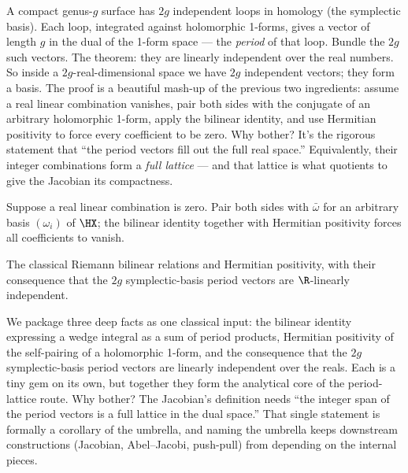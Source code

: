 \begin{layman}
A compact genus-\(g\) surface has \(2g\) independent loops in homology
(the symplectic basis). Each loop, integrated against holomorphic
1-forms, gives a vector of length \(g\) in the dual of the 1-form
space — the \emph{period} of that loop. Bundle the \(2g\) such
vectors. The theorem: they are linearly independent over the real
numbers. So inside a \(2g\)-real-dimensional space we have \(2g\)
independent vectors; they form a basis. The proof is a beautiful
mash-up of the previous two ingredients: assume a real linear
combination vanishes, pair both sides with the conjugate of an arbitrary
holomorphic 1-form, apply the bilinear identity, and use Hermitian
positivity to force every coefficient to be zero. Why bother? It's the
rigorous statement that ``the period vectors fill out the full real
space.'' Equivalently, their integer combinations form a \emph{full
lattice} — and that lattice is what quotients to give the Jacobian its
compactness.
\end{layman}

\begin{proofsketch}
Suppose a real linear combination is zero. Pair both sides with
\(\bar\omega\) for an arbitrary basis \((\omega_i)\) of \(\HX\); the
bilinear identity together with Hermitian positivity forces all
coefficients to vanish.
\end{proofsketch}

\begin{theorem}
\label{input:riemann-bilinear}
\leanok
The classical Riemann bilinear relations and Hermitian positivity, with
their consequence that the \(2g\) symplectic-basis period vectors are
\(\R\)-linearly independent.
\end{theorem}

\begin{layman}
We package three deep facts as one classical input: the bilinear
identity expressing a wedge integral as a sum of period products,
Hermitian positivity of the self-pairing of a holomorphic 1-form, and
the consequence that the \(2g\) symplectic-basis period vectors are
linearly independent over the reals. Each is a tiny gem on its own,
but together they form the analytical core of the period-lattice
route. Why bother? The Jacobian's definition needs ``the integer span
of the period vectors is a full lattice in the dual space.'' That
single statement is formally a corollary of the umbrella, and naming
the umbrella keeps downstream constructions (Jacobian, Abel–Jacobi,
push-pull) from depending on the internal pieces.
\end{layman}

